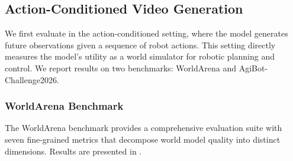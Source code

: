 \subsection{Action-Conditioned Video Generation}
\label{sec:exp-action}

We first evaluate \methodname{} in the action-conditioned setting, where the model generates future observations given a sequence of robot actions. This setting directly measures the model's utility as a world simulator for robotic planning and control. We report results on two benchmarks: WorldArena and AgiBot-Challenge2026.

\subsubsection{WorldArena Benchmark}

The WorldArena benchmark provides a comprehensive evaluation suite with seven fine-grained metrics that decompose world model quality into distinct dimensions. Results are presented in .

\begin{table}[t]
	\centering
	\caption{Action-conditioned generation results on the WorldArena benchmark. Best results are in \textbf{bold}, second best are \underline{underlined}.}
	\label{tab:action-worldarena}
	\renewcommand{\arraystretch}{1.15}
\end{table}

